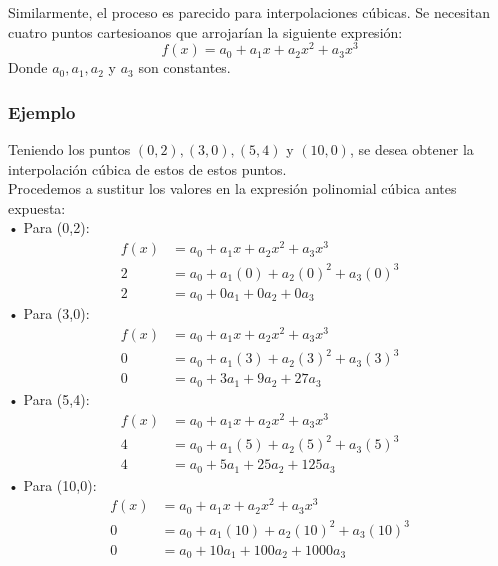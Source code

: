 \documentclass[letterpaper, 12pt]{article}
\begin{document}
\newpage
\justify
Similarmente, el proceso es parecido para interpolaciones cúbicas. Se necesitan cuatro puntos cartesioanos que arrojarían
la siguiente expresión:
{\large \[f(x)=a_0+a_1x+a_2x^2+a_3x^3\]}
Donde \(a_0,a_1,a_2\) y \(a_3\) son constantes.
\subsubsection*{Ejemplo}
\justify
Teniendo los puntos \((0,2), (3,0), (5,4)\) y \((10,0)\), se desea obtener la interpolación cúbica de estos de estos puntos.
\\\newline
Procedemos a sustitur los valores en la expresión polinomial cúbica antes expuesta:
\\\newline
• Para (0,2):
{\large\begin{equation*}
    \begin{aligned}
        f(x)&=a_0+a_1x+a_2x^2+a_3x^3\\
        2&=a_0+a_1(0)+a_2(0)^2+a_3(0)^3\\
        2&=a_0+0a_1+0a_2+0a_3
    \end{aligned}
\end{equation*}}
• Para (3,0):
{\large\begin{equation*}
    \begin{aligned}
        f(x)&=a_0+a_1x+a_2x^2+a_3x^3\\
        0&=a_0+a_1(3)+a_2(3)^2+a_3(3)^3\\
        0&=a_0+3a_1+9a_2+27a_3
    \end{aligned}
\end{equation*}}
• Para (5,4):
{\large\begin{equation*}
    \begin{aligned}
        f(x)&=a_0+a_1x+a_2x^2+a_3x^3\\
        4&=a_0+a_1(5)+a_2(5)^2+a_3(5)^3\\
        4&=a_0+5a_1+25a_2+125a_3
    \end{aligned}
\end{equation*}}
• Para (10,0):
{\large\begin{equation*}
    \begin{aligned}
        f(x)&=a_0+a_1x+a_2x^2+a_3x^3\\
        0&=a_0+a_1(10)+a_2(10)^2+a_3(10)^3\\
        0&=a_0+10a_1+100a_2+1000a_3
    \end{aligned}
\end{equation*}}
\end{document}
